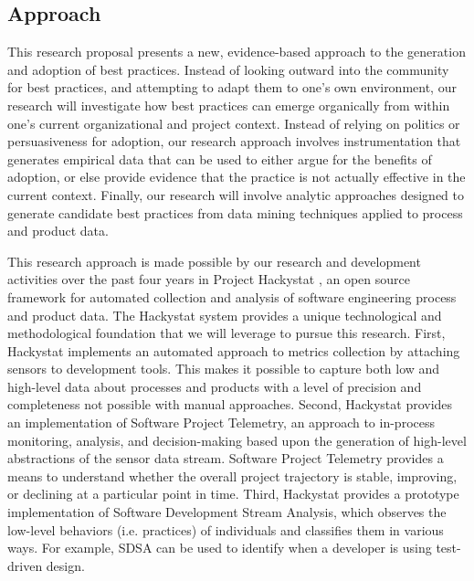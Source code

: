 \subsection{Approach}

This research proposal presents a new, evidence-based approach to the
generation and adoption of best practices.  Instead of looking outward into
the community for best practices, and attempting to adapt them to one's own
environment, our research will investigate how best practices can emerge
organically from within one's current organizational and project context.
Instead of relying on politics or persuasiveness for adoption, our research
approach involves instrumentation that generates empirical data that can be
used to either argue for the benefits of adoption, or else provide evidence
that the practice is not actually effective in the current context.
Finally, our research will involve analytic approaches designed to generate
candidate best practices from data mining techniques applied to process and
product data.

This research approach is made possible by our research and development
activities over the past four years in Project Hackystat \cite{Hackystat}, an open source
framework for automated collection and analysis of software engineering
process and product data.  The Hackystat system provides a unique
technological and methodological foundation that we will leverage to pursue
this research.  First, Hackystat implements an automated approach to
metrics collection by attaching sensors to development tools. This makes it
possible to capture both low and high-level data about processes and
products with a level of precision and completeness not possible with
manual approaches. Second, Hackystat provides an implementation of Software
Project Telemetry, an approach to in-process monitoring, analysis, and
decision-making based upon the generation of high-level abstractions of the
sensor data stream.  Software Project Telemetry provides a means to
understand whether the overall project trajectory is stable, improving, or
declining at a particular point in time. Third, Hackystat provides a prototype
implementation of Software Development Stream Analysis, which observes the
low-level behaviors (i.e.  practices) of individuals and classifies them in
various ways. For example, SDSA can be used to identify when a developer is
using test-driven design.

